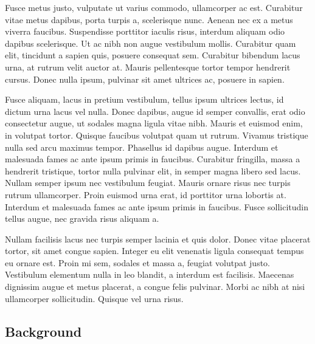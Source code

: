 Fusce metus justo, vulputate ut varius commodo, ullamcorper ac est. Curabitur vitae metus dapibus, porta turpis a, scelerisque nunc. Aenean nec ex a metus viverra faucibus. Suspendisse porttitor iaculis risus, interdum aliquam odio dapibus scelerisque. Ut ac nibh non augue vestibulum mollis. Curabitur quam elit, tincidunt a sapien quis, posuere consequat sem. Curabitur bibendum lacus urna, at rutrum velit auctor at. Mauris pellentesque tortor tempor hendrerit cursus. Donec nulla ipsum, pulvinar sit amet ultrices ac, posuere in sapien.

Fusce aliquam, lacus in pretium vestibulum, tellus ipsum ultrices lectus, id dictum urna lacus vel nulla. Donec dapibus, augue id semper convallis, erat odio consectetur augue, ut sodales magna ligula vitae nibh. Mauris et euismod enim, in volutpat tortor. Quisque faucibus volutpat quam ut rutrum. Vivamus tristique nulla sed arcu maximus tempor. Phasellus id dapibus augue. Interdum et malesuada fames ac ante ipsum primis in faucibus. Curabitur fringilla, massa a hendrerit tristique, tortor nulla pulvinar elit, in semper magna libero sed lacus. Nullam semper ipsum nec vestibulum feugiat. Mauris ornare risus nec turpis rutrum ullamcorper. Proin euismod urna erat, id porttitor urna lobortis at. Interdum et malesuada fames ac ante ipsum primis in faucibus. Fusce sollicitudin tellus augue, nec gravida risus aliquam a.

Nullam facilisis lacus nec turpis semper lacinia et quis dolor. Donec vitae placerat tortor, sit amet congue sapien. Integer eu elit venenatis ligula consequat tempus eu ornare est. Proin mi sem, sodales et massa a, feugiat volutpat justo. Vestibulum elementum nulla in leo blandit, a interdum est facilisis. Maecenas dignissim augue et metus placerat, a congue felis pulvinar. Morbi ac nibh at nisi ullamcorper sollicitudin. Quisque vel urna risus.



\subsection{Background}

